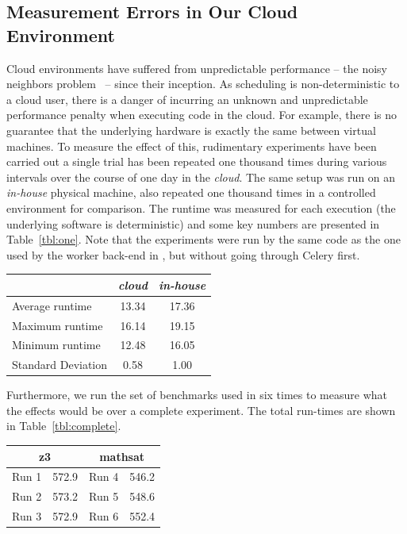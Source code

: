 \documentclass[a4paper]{IEEEtran}
\begin{document}
\subsection{Measurement Errors in Our Cloud Environment}
Cloud environments have suffered from unpredictable performance -- the noisy
neighbors problem~\cite{williamson} -- since their inception. As scheduling is
non-deterministic to a cloud user, there is a danger of incurring an unknown and
unpredictable performance penalty when executing code in the cloud. For example,
there is no guarantee that the underlying hardware is exactly the same between
virtual machines. To measure the effect of this, rudimentary experiments have
been carried out a single trial has been repeated one thousand times during
various intervals over the course of one day in the \emph{cloud}. The same setup
was run on an \emph{in-house} physical machine, also repeated one thousand times
in a controlled environment for comparison. The runtime was measured for each
execution (the underlying software is deterministic) and some key numbers are
presented in Table~\ref{tbl:one}. Note that the experiments were run by the same
code as the one used by the worker back-end in \testbench{}, but without going
through Celery first.

\begin{Figure}
  \centering
  \begin{tabular}{|l|c|c|}
    \hline
    & \emph{cloud} & \emph{in-house} \\
  \hline
  Average runtime &  13.34 & 17.36\\
  \hline
  Maximum runtime & 16.14 & 19.15 \\
  \hline
  Minimum runtime & 12.48 & 16.05\\
  \hline      
  Standard Deviation & 0.58 & 1.00 \\
  \hline
\end{tabular}
\label{tbl:one}
\end{Figure}

Furthermore, we run the set of benchmarks used in \cite{uppsat} six times to measure what the effects would be over a complete experiment. The total run-times are shown in Table~\ref{tbl:complete}.

\begin{Figure}
  \centering
\begin{tabular}{|l|c|l|c|}
  \hline
  \multicolumn{2}{|c|}{z3} & \multicolumn{2}{c|}{mathsat} \\
  \hline
  Run 1 &  572.9 & Run 4 & 546.2 \\
  \hline
  Run 2 & 573.2 & Run 5 & 548.6 \\
  \hline
  Run 3 & 572.9 & Run 6 & 552.4 \\
  \hline      
\end{tabular}
\label{tbl:complete}
\end{Figure}
\end{document}
